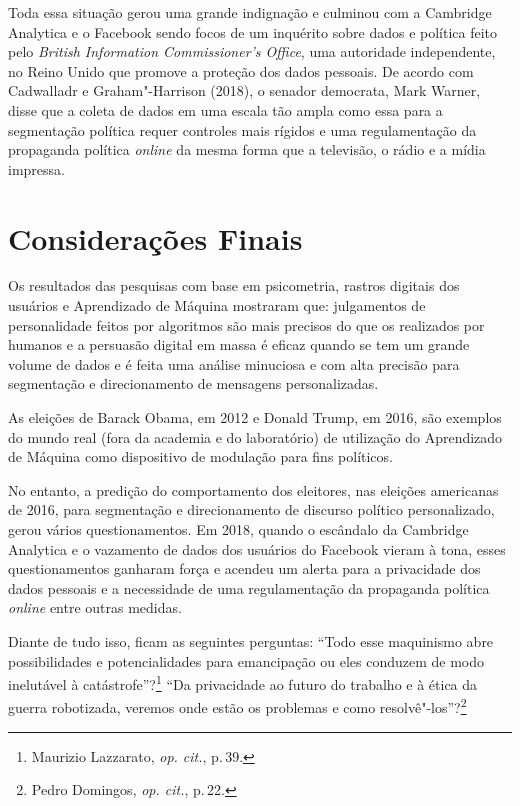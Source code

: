 Toda essa situação gerou uma grande indignação e culminou com a
Cambridge Analytica e o Facebook sendo focos de um inquérito sobre dados
e política feito pelo \emph{British Information Commissioner's Office},
uma autoridade independente, no Reino Unido que promove a proteção dos
dados pessoais. De acordo com Cadwalladr e Graham"-Harrison
(2018), o senador democrata, Mark Warner, disse que a coleta de dados em
uma escala tão ampla como essa para a segmentação política requer
controles mais rígidos e uma regulamentação da propaganda política
\emph{online} da mesma forma que a televisão, o rádio e a mídia impressa.

\section{Considerações Finais}

Os resultados das pesquisas com base em psicometria, rastros digitais
dos usuários e Aprendizado de Máquina mostraram que: julgamentos de
personalidade feitos por algoritmos são mais precisos do que os
realizados por humanos e a persuasão digital em massa é eficaz quando se
tem um grande volume de dados e é feita uma análise minuciosa e com alta
precisão para segmentação e direcionamento de mensagens personalizadas.

As eleições de Barack Obama, em 2012 e Donald Trump, em 2016, são
exemplos do mundo real (fora da academia e do laboratório) de utilização
do Aprendizado de Máquina como dispositivo de modulação para fins
políticos.

No entanto, a predição do comportamento dos eleitores, nas eleições
americanas de 2016, para segmentação e direcionamento de discurso
político personalizado, gerou vários questionamentos. Em 2018, quando o
escândalo da Cambridge Analytica e o vazamento de dados dos usuários do
Facebook vieram à tona, esses questionamentos ganharam força e acendeu
um alerta para a privacidade dos dados pessoais e a necessidade de uma
regulamentação da propaganda política \emph{online} entre outras medidas.

Diante de tudo isso, ficam as seguintes perguntas: ``Todo esse
maquinismo abre possibilidades e potencialidades para emancipação ou
eles conduzem de modo inelutável à catástrofe''?\footnote{Maurizio Lazzarato, \textit{op. cit.}, p.\,39.}
``Da privacidade ao futuro do trabalho e à ética da guerra robotizada,
veremos onde estão os problemas e como resolvê"-los''?\footnote{Pedro Domingos, \textit{op. cit.}, p.\,22.}

